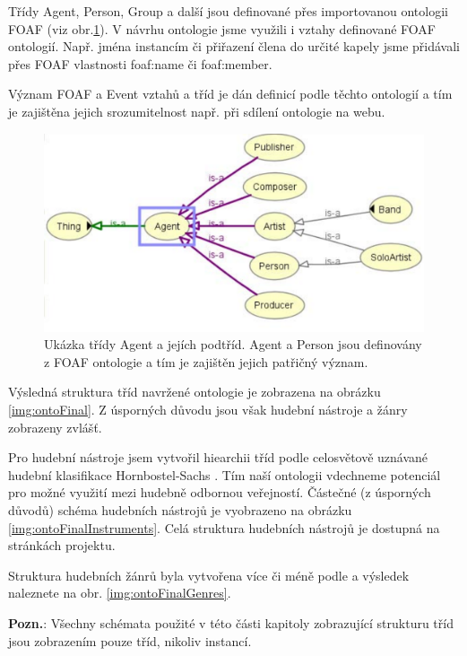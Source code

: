 Třídy Agent, Person, Group a další jsou definované přes importovanou ontologii FOAF (viz obr.\ref{img:foafclasses}).
V návrhu ontologie jsme využili i vztahy definované FOAF ontologií. Např. jména instancím či přiřazení člena do určité kapely jsme přidávali přes FOAF vlastnosti foaf:name či foaf:member.

Význam FOAF a Event vztahů a tříd je dán definicí podle těchto ontologií a tím je zajištěna jejich srozumitelnost např. při sdílení ontologie na webu. 

\begin{figure}[h]
\begin{center}
\includegraphics[width=13cm]{figures/foafclasses}
\caption{Ukázka třídy Agent a jejích podtříd. Agent a Person jsou definovány z FOAF ontologie a tím je zajištěn jejich patřičný význam.}
\label{img:foafclasses}
\end{center}
\end{figure}

Výsledná struktura tříd navržené ontologie je zobrazena na obrázku \ref{img:ontoFinal}. 
Z úsporných důvodu jsou však hudební nástroje a žánry zobrazeny zvlášť. 

Pro hudební nástroje jsem vytvořil hiearchii tříd podle celosvětově uznávané hudební klasifikace Hornbostel-Sachs \cite{hornsachs}.
Tím naší ontologii vdechneme potenciál pro možné využití mezi hudebně odbornou veřejností. Částečné (z úsporných důvodů) schéma hudebních nástrojů je vyobrazeno na obrázku \ref{img:ontoFinalInstruments}. Celá struktura hudebních nástrojů je dostupná na stránkách projektu.

Struktura hudebních žánrů byla vytvořena více či méně podle \cite{allmusic} a výsledek naleznete na obr. \ref{img:ontoFinalGenres}.

\textbf{Pozn.}: Všechny schémata použité v této části kapitoly zobrazující strukturu tříd jsou zobrazením pouze tříd, nikoliv instancí.

